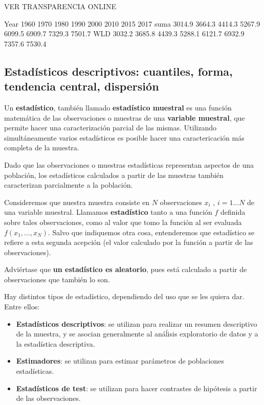 \documentclass[11pt]{article}
\providecommand{\tightlist}{%
      \setlength{\itemsep}{0pt}\setlength{\parskip}{0pt}}
\begin{document}
VER TRANSPARENCIA ONLINE
    
Year   1960   1970   1980   1990   2000   2010   2015   2017
suma 3014.9 3664.3 4414.3 5267.9 6099.5 6909.7 7329.3 7501.7
WLD  3032.2 3685.8 4439.3 5288.1 6121.7 6932.9 7357.6 7530.4
            
    \subsection*{Estadísticos descriptivos: cuantiles, forma, tendencia
central,
dispersión}\label{estaduxedsticos-descriptivos-cuantiles-forma-tendencia-central-dispersiuxf3n}

Un \textbf{estadístico}, también llamado \textbf{estadístico muestral}
es una función matemática de las observaciones o muestras de una
\textbf{variable muestral}, que permite hacer una caracterización
parcial de las mismas. Utilizando simultáneamente varios estadísticos es
posible hacer una caractericación más completa de la muestra.

Dado que las observaciones o muestras estadísticas representan aspectos
de una población, los estadísticos calculados a partir de las muestras
también caracterizan parcialmente a la población.

    Consideremos que nuestra muestra consiste en \(N\) observaciones \(x_i\)
, \(i = 1 \ldots N\) de una variable muestral. Llamamos
\textbf{estadístico} tanto a una función \(f\) definida sobre tales
observaciones, como al valor que tomo la función al ser evaluada
\(f(x_1,\ldots , x_N)\). Salvo que indiquemos otra cosa, entenderemos
que estadístico se refiere a esta segunda acepción (el valor calculado
por la función a partir de las observaciones).

Adviértase que \textbf{un estadístico es aleatorio}, pues está calculado
a partir de observaciones que también lo son.

    Hay distintos tipos de estadístico, dependiendo del uso que se les
quiera dar. Entre ellos:

\begin{itemize}
\tightlist
\item
  \textbf{Estadísticos descriptivos}: se utilizan para realizar un
  resumen descriptivo de la muestra, y se asocian generalmente al
  anáĺisis exploratorio de datos y a la estadística descriptiva.
\item
  \textbf{Estimadores}: se utilizan para estimar parámetros de
  poblaciones estadísticas.
\item
  \textbf{Estadísticos de test}: se utilizan para hacer contrastes de
  hipótesis a partir de las observaciones.
\end{itemize}
\end{document}
